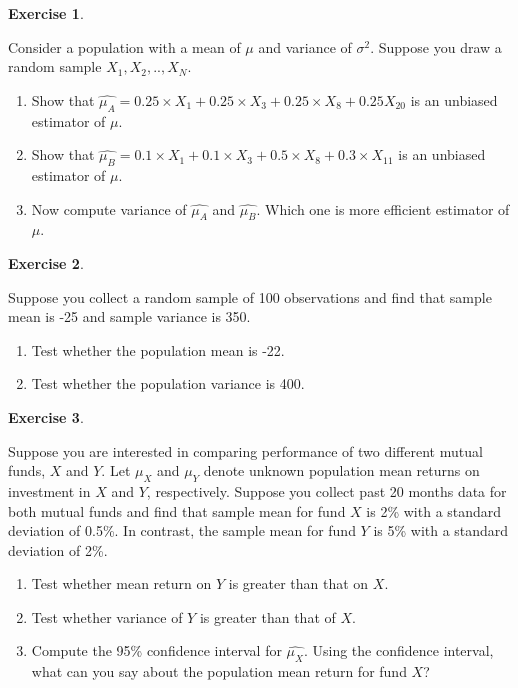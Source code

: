 \documentclass[
]{book}
\theoremstyle{definition}
\theoremstyle{definition}
\theoremstyle{definition}
\newtheorem{exercise}{Exercise}[chapter]
\theoremstyle{definition}
\theoremstyle{remark}
\begin{document}
\begin{exercise}
\protect\hypertarget{exr:unnamed-chunk-55}{}\label{exr:unnamed-chunk-55}

Consider a population with a mean of \(\mu\) and variance of \(\sigma^2\). Suppose you draw a random sample \(X_1, X_2,..,X_N\).

\begin{enumerate}
\def\labelenumi{\alph{enumi}.}
\item
  Show that \(\widehat{\mu_A}=0.25\times X_1 +0.25\times X_3+ 0.25 \times X_8 + 0.25 X_{20}\) is an unbiased estimator of \(\mu\).
\item
  Show that \(\widehat{\mu_B}=0.1\times X_1 +0.1\times X_3+ 0.5 \times X_8+0.3 \times X_{11}\) is an unbiased estimator of \(\mu\).
\item
  Now compute variance of \(\widehat{\mu_A}\) and \(\widehat{\mu_B}\). Which one is more efficient estimator of \(\mu\).
\end{enumerate}

\end{exercise}

\begin{exercise}
\protect\hypertarget{exr:unnamed-chunk-56}{}\label{exr:unnamed-chunk-56}

Suppose you collect a random sample of 100 observations and find that sample mean is -25 and sample variance is 350.

\begin{enumerate}
\def\labelenumi{\alph{enumi}.}
\item
  Test whether the population mean is -22.
\item
  Test whether the population variance is 400.
\end{enumerate}

\end{exercise}

\begin{exercise}
\protect\hypertarget{exr:unnamed-chunk-57}{}\label{exr:unnamed-chunk-57}

Suppose you are interested in comparing performance of two different mutual funds, \(X\) and \(Y\). Let \(\mu_X\) and \(\mu_Y\) denote unknown population mean returns on investment in \(X\) and \(Y\), respectively. Suppose you collect past 20 months data for both mutual funds and find that sample mean for fund \(X\) is 2\% with a standard deviation of 0.5\%. In contrast, the sample mean for fund \(Y\) is 5\% with a standard deviation of 2\%.

\begin{enumerate}
\def\labelenumi{\alph{enumi}.}
\item
  Test whether mean return on \(Y\) is greater than that on \(X\).
\item
  Test whether variance of \(Y\) is greater than that of \(X\).
\item
  Compute the 95\% confidence interval for \(\widehat{\mu_X}\). Using the confidence interval, what can you say about the population mean return for fund \(X\)?
\end{enumerate}

\end{exercise}
\end{document}
